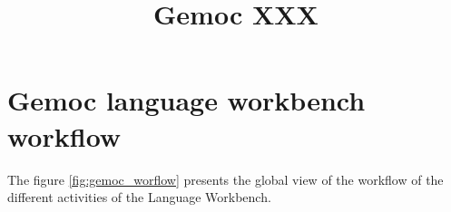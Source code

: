 \documentclass{gemoc} %
\title{Gemoc XXX }
\begin{document}
\maketitle

\begin{revisions}
	\begin{revtable}
		\dates{}{}{}{}{}
		\writers{}{}{}{}{}
		\approvers{}{}{}{}{}
	\end{revtable}
	\begin{revisionlabels}
		\revlabel{}
	\end{revisionlabels}
\end{revisions}
\begin{tableofauthors}
\end{tableofauthors}

\tableofcontents
\newpage

\chapter{Gemoc language workbench workflow}

The figure \ref{fig:gemoc_worflow} presents the global view of the workflow of the different activities of the Language Workbench.
\end{document}
